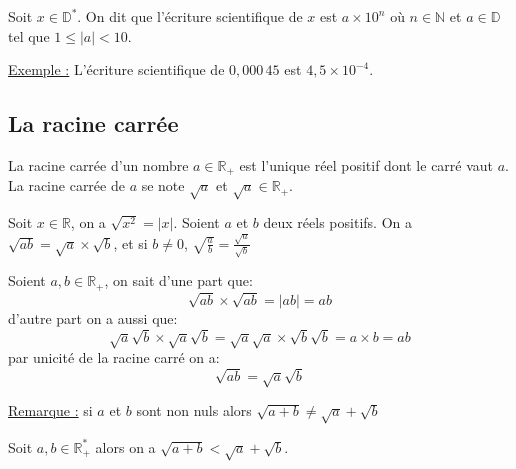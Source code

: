 \documentclass[french]{book}
\begin{document}
\begin{defn}
Soit $x \in \mathbb{D}^*$. On dit que l'écriture scientifique de $x$ est $a \times 10^n$ où $n \in \mathbb{N}$ et $a\in\mathbb{D}$ tel que $1\leq \vert a \vert < 10$.  \vspace{4mm}
\end{defn}
 
\underline{Exemple :}
L'écriture scientifique de $0,000\,45$ est $4,5 \times 10^{-4}$.

\subsection{La racine carrée}
\begin{defn}
La racine carrée d'un nombre $a\in\mathbb{R}_+$ est l'unique réel positif dont le carré vaut $a$. La racine carrée de $a$ se note $\sqrt{a}$ et $\sqrt{a}\in \mathbb{R}_+$.
\end{defn}

\begin{prop}
Soit $x\in\mathbb{R}$, on a $\sqrt{x^2}=\vert x \vert$.
Soient $a$ et $b$ deux réels positifs. On a $\sqrt{ab}=\sqrt{a}\times \sqrt{b}$, et si $b\neq0$, $\sqrt{\frac{a}{b}}=\frac{\sqrt{a}}{\sqrt{b}}$
\end{prop}

\begin{demo}
Soient $a,b \in \mathbb{R}_+$, on sait d'une part que:
$$\sqrt{ab} \times \sqrt{ab} = \vert ab \vert = ab $$
d'autre part on a aussi que:
$$\sqrt{a} \sqrt{b} \times \sqrt{a} \sqrt{b}= \sqrt{a} \sqrt{a} \times \sqrt{b} \sqrt{b}= a \times b = ab$$
par unicité de la racine carré on a:
$$\sqrt{ab}=\sqrt{a} \sqrt{b}$$
\end{demo}

\underline{Remarque :}
si $a$ et $b$ sont non nuls alors $\sqrt{a+b} \neq \sqrt{a} + \sqrt{b}$

\begin{thm}
Soit $a,b \in \mathbb{R}^{*}_{+}$ alors on a $\sqrt{a+b} < \sqrt{a} + \sqrt{b}$.
\end{thm}
\end{document}
